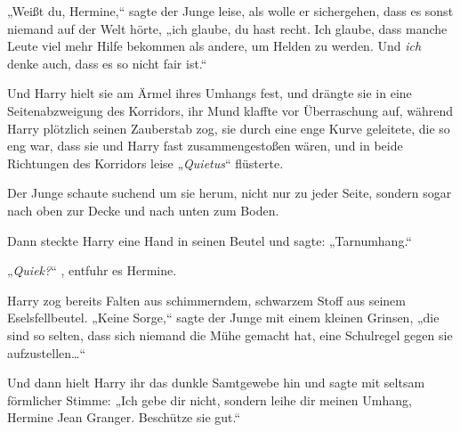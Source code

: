 „Weißt du, Hermine,“ sagte der Junge leise, als wolle er sichergehen, dass es sonst niemand auf der Welt hörte, „ich glaube, du hast recht. Ich glaube, dass manche Leute viel mehr Hilfe bekommen als andere, um Helden zu werden. Und \emph{ich} denke auch, dass es so nicht fair ist.“

Und Harry hielt sie am Ärmel ihres Umhangs fest, und drängte sie in eine Seitenabzweigung des Korridors, ihr Mund klaffte vor Überraschung auf, während Harry plötzlich seinen Zauberstab zog, sie durch eine enge Kurve geleitete, die so eng war, dass sie und Harry fast zusammengestoßen wären, und in beide Richtungen des Korridors leise „\emph{Quietus}“ flüsterte.

Der Junge schaute suchend um sie herum, nicht nur zu jeder Seite, sondern sogar nach oben zur Decke und nach unten zum Boden.

Dann steckte Harry eine Hand in seinen Beutel und sagte: „Tarnumhang.“

„\emph{Quiek?}“ , entfuhr es Hermine.

Harry zog bereits Falten aus schimmerndem, schwarzem Stoff aus seinem Eselsfellbeutel. „Keine Sorge,“ sagte der Junge mit einem kleinen Grinsen, „die sind so selten, dass sich niemand die Mühe gemacht hat, eine Schulregel gegen sie aufzustellen…“

Und dann hielt Harry ihr das dunkle Samtgewebe hin und sagte mit seltsam förmlicher Stimme: „Ich gebe dir nicht, sondern leihe dir meinen Umhang, Hermine Jean Granger. Beschütze sie gut.“

